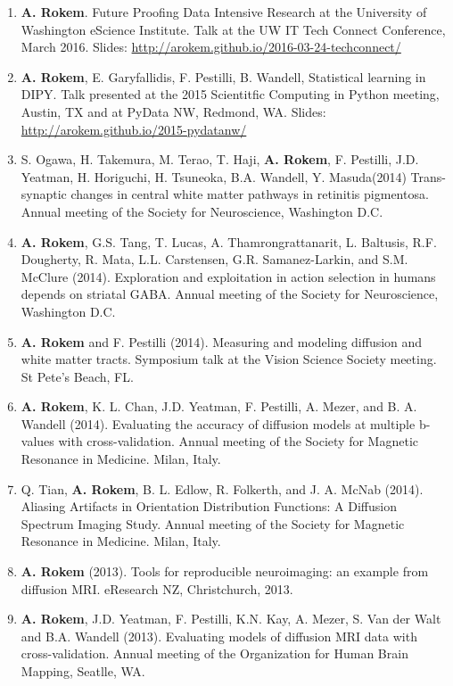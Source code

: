 \documentclass[11pt,fullpage]{article}
\begin{document}
\begin{enumerate}
\item {\bf A. Rokem}. Future Proofing Data Intensive Research at the University of Washington eScience Institute. Talk at the UW IT Tech Connect Conference, March 2016. Slides: \url{http://arokem.github.io/2016-03-24-techconnect/}

\item {\bf A. Rokem}, E. Garyfallidis, F. Pestilli, B. Wandell, Statistical learning in DIPY. Talk presented at the 2015 Scientitfic Computing in Python meeting, Austin, TX and at PyData NW, Redmond, WA. Slides: \url{http://arokem.github.io/2015-pydatanw/}

\item S. Ogawa, H. Takemura, M. Terao, T. Haji, {\bf A. Rokem}, F. Pestilli, J.D. Yeatman, H. Horiguchi, H. Tsuneoka, B.A. Wandell, Y. Masuda(2014) Trans-synaptic changes in central white matter pathways in retinitis pigmentosa. Annual meeting of the Society for Neuroscience, Washington D.C.

\item {\bf A. Rokem}, G.S. Tang, T. Lucas, A. Thamrongrattanarit, L. Baltusis, R.F. Dougherty, R. Mata, L.L. Carstensen, G.R. Samanez-Larkin, and S.M. McClure (2014). Exploration and exploitation in action selection in humans depends on striatal GABA. Annual meeting of the Society for Neuroscience, Washington D.C.

\item {\bf A. Rokem} and F. Pestilli (2014). Measuring and modeling diffusion and white matter tracts. Symposium talk at the Vision Science Society meeting. St Pete's Beach, FL.

\item {\bf A. Rokem}, K. L. Chan, J.D. Yeatman, F. Pestilli, A. Mezer, and B. A. Wandell (2014). Evaluating the accuracy of diffusion models at multiple b-values with cross-validation. Annual meeting of the Society for Magnetic Resonance in Medicine. Milan, Italy.

\item Q. Tian, {\bf A. Rokem}, B. L. Edlow, R. Folkerth, and J. A. McNab (2014). Aliasing Artifacts in Orientation Distribution Functions: A Diffusion Spectrum Imaging Study. Annual meeting of the Society for Magnetic Resonance in Medicine. Milan, Italy.

\item {\bf A. Rokem} (2013). Tools for reproducible neuroimaging: an example from diffusion MRI. eResearch NZ, Christchurch, 2013.

\item {\bf A. Rokem}, J.D. Yeatman, F. Pestilli, K.N. Kay, A. Mezer, S. Van der Walt and B.A. Wandell (2013). Evaluating models of diffusion MRI data with cross-validation. Annual meeting of the Organization for Human Brain Mapping, Seatlle, WA.


\end{enumerate}
\end{document}
